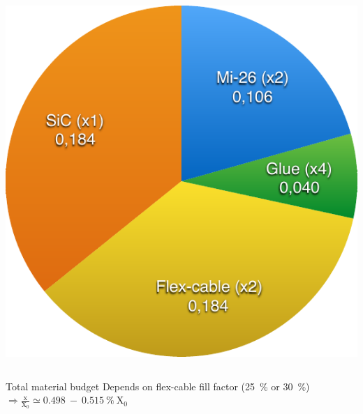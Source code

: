 \documentclass{beamer}
\begin{document}
\begin{frame}
\begin{columns}[c]
\begin{column}{5cm}
        \includegraphics[width = \textwidth]{Pictures/X02.pdf}
      \end{column}
    \end{columns}

    \begin{block}{Total material budget}
      \centering 
      Depends on flex-cable fill factor (25~\% or 30~\%)
      $\Rightarrow \frac{\text{x}}{\text{X}_0} \simeq 0.498~-~0.515~\%~\text{X}_0$
    \end{block}
  \end{frame}
\end{document}
